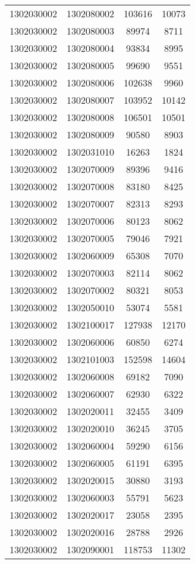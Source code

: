 \begin{longtable}[h]{llcc}
		1302030002 & 1302080002 & 103616 & 10073\\
		1302030002 & 1302080003 & 89974 & 8711\\
		1302030002 & 1302080004 & 93834 & 8995\\
		1302030002 & 1302080005 & 99690 & 9551\\
		1302030002 & 1302080006 & 102638 & 9960\\
		1302030002 & 1302080007 & 103952 & 10142\\
		1302030002 & 1302080008 & 106501 & 10501\\
		1302030002 & 1302080009 & 90580 & 8903\\
		1302030002 & 1302031010 & 16263 & 1824\\
		1302030002 & 1302070009 & 89396 & 9416\\
		1302030002 & 1302070008 & 83180 & 8425\\
		1302030002 & 1302070007 & 82313 & 8293\\
		1302030002 & 1302070006 & 80123 & 8062\\
		1302030002 & 1302070005 & 79046 & 7921\\
		1302030002 & 1302060009 & 65308 & 7070\\
		1302030002 & 1302070003 & 82114 & 8062\\
		1302030002 & 1302070002 & 80321 & 8053\\
		1302030002 & 1302050010 & 53074 & 5581\\
		1302030002 & 1302100017 & 127938 & 12170\\
		1302030002 & 1302060006 & 60850 & 6274\\
		1302030002 & 1302101003 & 152598 & 14604\\
		1302030002 & 1302060008 & 69182 & 7090\\
		1302030002 & 1302060007 & 62930 & 6322\\
		1302030002 & 1302020011 & 32455 & 3409\\
		1302030002 & 1302020010 & 36245 & 3705\\
		1302030002 & 1302060004 & 59290 & 6156\\
		1302030002 & 1302060005 & 61191 & 6395\\
		1302030002 & 1302020015 & 30880 & 3193\\
		1302030002 & 1302060003 & 55791 & 5623\\
		1302030002 & 1302020017 & 23058 & 2395\\
		1302030002 & 1302020016 & 28788 & 2926\\
		1302030002 & 1302090001 & 118753 & 11302\\

\end{longtable}
